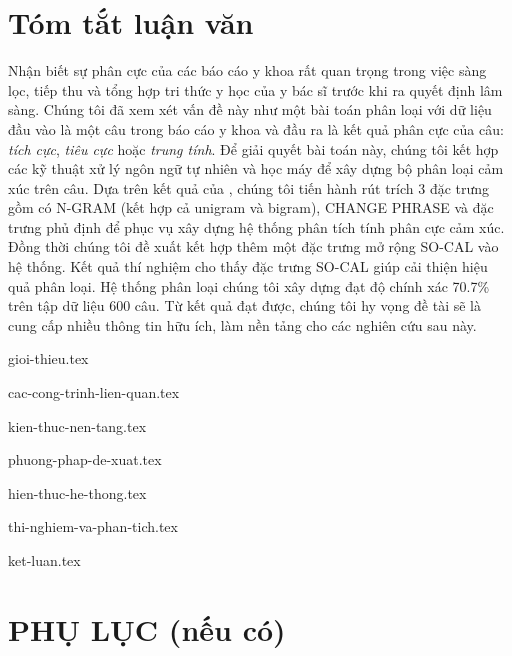 \documentclass[a4paper, 12pt]{article}
\theoremstyle{definition}
\newcommand{\tichcuc}{\textit{tích cực}\xspace}
\newcommand{\tieucuc}{\textit{tiêu cực}\xspace}
\newcommand{\trungtinh}{\textit{trung tính}\xspace}
\begin{document}
\section*{Tóm tắt luận văn}
Nhận biết sự phân cực của các báo cáo y khoa rất quan trọng trong việc sàng lọc, tiếp thu và tổng hợp tri thức y học của y bác sĩ trước khi ra quyết định lâm sàng. Chúng tôi đã xem xét vấn đề này như một bài toán phân loại với dữ liệu đầu vào là một câu trong báo cáo y khoa và đầu ra là kết quả phân cực của câu: \tichcuc, \tieucuc hoặc \trungtinh. Để giải quyết bài toán này, chúng tôi kết hợp các kỹ thuật xử lý ngôn ngữ tự nhiên và học máy để xây dựng bộ phân loại cảm xúc trên câu. Dựa trên kết quả của \cite{niu2005analysis}, chúng tôi tiến hành rút trích 3 đặc trưng gồm có N-GRAM (kết hợp cả unigram và bigram), CHANGE PHRASE và đặc trưng phủ định để phục vụ xây dựng hệ thống phân tích tính phân cực cảm xúc. Đồng thời chúng tôi đề xuất kết hợp thêm một đặc trưng mở rộng SO-CAL vào hệ thống. Kết quả thí nghiệm cho thấy đặc trưng SO-CAL giúp cải thiện hiệu quả phân loại. Hệ thống phân loại chúng tôi xây dựng đạt độ chính xác 70.7\% trên tập dữ liệu 600 câu. Từ kết quả đạt được, chúng tôi hy vọng đề tài sẽ là cung cấp nhiều thông tin hữu ích, làm nền tảng cho các nghiên cứu sau này.

\pagebreak
\tableofcontents

\thispagestyle{empty}
\pagebreak
\listoffigures
\pagebreak
\listoftables

\pagebreak
{gioi-thieu.tex}
\pagebreak

{cac-cong-trinh-lien-quan.tex}
\pagebreak

{kien-thuc-nen-tang.tex}
\pagebreak

{phuong-phap-de-xuat.tex}
\pagebreak

{hien-thuc-he-thong.tex}
\pagebreak

{thi-nghiem-va-phan-tich.tex}
\pagebreak

{ket-luan.tex}
\pagebreak

\printbibliography[title={Tài liệu tham khảo}]
\pagebreak

\section*{PHỤ LỤC (nếu có)}
\end{document}
